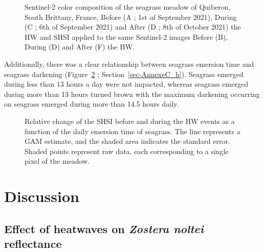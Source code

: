 \documentclass[
  letterpaper,
  11pt,
  english,
  singlespacing,
  headsepline]{MastersDoctoralThesis}
\begin{document}
\begin{spacing}{1.5}
\begin{figure}
{}

\caption{\label{fig-Map_darkening_Bathy}Sentinel-2 color composition of
the seagrass meadow of Quiberon, South Brittany, France, Before (A ; 1st
of September 2021), During (C ; 6th of September 2021) and After (D ;
8th of October 2021) the HW and SHSI applied to the same Sentinel-2
images Before (B), During (D) and After (F) the HW.}

\end{figure}%

Additionally, there was a clear relationship between seagrass emersion
time and seagrass darkening (Figure~\ref{fig-GAM_Emersion} ;
Section~\ref{sec-AnnexeC_h}). Seagrass emerged during less than 13 hours
a day were not impacted, whereas seagrass emerged during more than 13
hours turned brown with the maximum darkening occurring on seagrass
emerged during more than 14.5 hours daily.

\begin{figure}


\caption{\label{fig-GAM_Emersion}Relative change of the SHSI before and
during the HW events as a function of the daily emersion time of
seagrass. The line represents a GAM estimate, and the shaded area
indicates the standard error. Shaded points represent raw data, each
corresponding to a single pixel of the meadow.}

\end{figure}%

\section{Discussion}\label{discussion-3}

\subsection{\texorpdfstring{Effect of heatwaves on \emph{Zostera noltei}
reflectance}{Effect of heatwaves on Zostera noltei reflectance}}\label{effect-of-heatwaves-on-zostera-noltei-reflectance}


\end{spacing}
\end{document}
